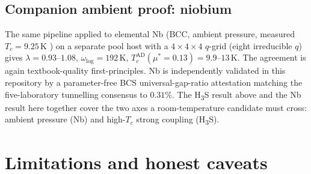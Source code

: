 \documentclass[11pt,a4paper]{article}
\begin{document}
\subsection{Companion ambient proof: niobium}

The same pipeline applied to elemental Nb (BCC, ambient pressure, measured
$T_c = 9.25$\,K \cite{allendynes1975}) on a separate pool host with a
$4{\times}4{\times}4$ $q$-grid (eight irreducible $q$) gives $\lambda = 0.93$--$1.08$,
$\omega_{\log} = 192$\,K, $T_c^{\text{AD}}(\mu^*=0.13) = 9.9$--$13$\,K. The
agreement is again textbook-quality first-principles. Nb is independently validated
in this repository by a parameter-free BCS universal-gap-ratio attestation
\cite{bcs1957} matching the five-laboratory tunnelling consensus to $0.31\%$. The
H\textsubscript{3}S result above and the Nb result here together cover the two
axes a room-temperature candidate must cross: ambient pressure (Nb) and
high-$T_c$ strong coupling (H\textsubscript{3}S).

\section{Limitations and honest caveats}
\label{sec:limits}
\end{document}
